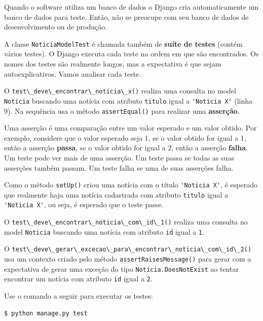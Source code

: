 \documentclass[brazil,a4paper,oneside,openright,parskip=full]{book}
\newcommand{\passthrough}[1]{#1}
\begin{document}
Quando o software utiliza um banco de dados o Django cria
automaticamente um banco de dados para teste. Então, não se preocupe com
seu banco de dados de desenvolvimento ou de produção.

A classe \passthrough{\lstinline!NoticiaModelTest!} é chamada também de
\textbf{suíte de testes} (contém vários testes). O Django executa cada
teste na ordem em que são encontrados. Os nomes dos testes são realmente
longos, mas a expectativa é que sejam autoexplicativos. Vamos analisar
cada teste.

O \passthrough{\lstinline!test\_deve\_encontrar\_noticia\_x()!} realiza
uma consulta no model \passthrough{\lstinline!Noticia!} buscando uma
notícia com atributo \passthrough{\lstinline!titulo!} igual a
\passthrough{\lstinline!'Noticia X'!} (linha 9). Na sequência usa o
método \passthrough{\lstinline!assertEqual()!} para realizar uma
\textbf{asserção}.

Uma asserção é uma comparação entre um valor esperado e um valor obtido.
Por exemplo, considere que o valor esperado seja 1, se o valor obtido
for igual a 1, então a asserção \textbf{passa}, se o valor obtido for
igual a 2, então a asserção \textbf{falha}. Um teste pode ver mais de
uma asserção. Um teste passa se todas as suas asserções também passam.
Um teste falha se uma de suas asserções falha.

Como o método \passthrough{\lstinline!setUp()!} criou uma notícia com o
título \passthrough{\lstinline!'Noticia X'!}, é esperado que realmente
haja uma notícia cadastrada com atributo
\passthrough{\lstinline!titulo!} igual a
\passthrough{\lstinline!'Noticia X'!}, ou seja, é esperado que o teste
passe.

O \passthrough{\lstinline!test\_deve\_encontrar\_noticia\_com\_id\_1()!}
realiza uma consulta no model \passthrough{\lstinline!Noticia!} buscando
uma notícia com atributo \passthrough{\lstinline!id!} igual a
\passthrough{\lstinline!1!}.

O
\passthrough{\lstinline!test\_deve\_gerar\_excecao\_para\_encontrar\_noticia\_com\_id\_2()!}
usa um contexto criado pelo método
\passthrough{\lstinline!assertRaisesMessage()!} para gerar com a
expectativa de gerar uma exceção do tipo
\passthrough{\lstinline!Noticia.DoesNotExist!} ao tentar encontrar um
notícia com atributo \passthrough{\lstinline!id!} igual a
\passthrough{\lstinline!2!}.

Use o comando a seguir para executar os testes:

\begin{lstlisting}[language=sh, style=nonumber]
$ python manage.py test
\end{lstlisting}
\end{document}
